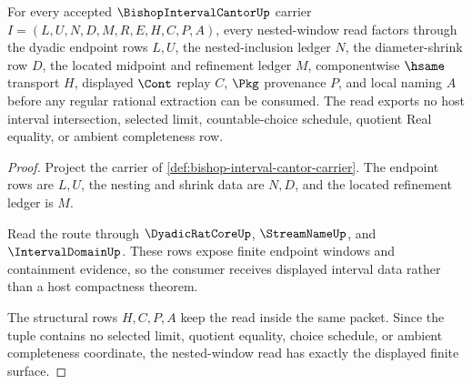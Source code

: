 \begin{theorem}
\label{thm:bishop-interval-cantor-nested-window}
For every accepted $\BishopIntervalCantorUp$ carrier $I=(L,U,N,D,M,R,E,H,C,P,A)$, every nested-window read factors through the dyadic endpoint rows $L,U$, the nested-inclusion ledger $N$, the diameter-shrink row $D$, the located midpoint and refinement ledger $M$, componentwise $\hsame$ transport $H$, displayed $\Cont$ replay $C$, $\Pkg$ provenance $P$, and local naming $A$ before any regular rational extraction can be consumed. The read exports no host interval intersection, selected limit, countable-choice schedule, quotient Real equality, or ambient completeness row.
\end{theorem}
\begin{proof}
Project the carrier of \autoref{def:bishop-interval-cantor-carrier}. The endpoint rows are $L,U$, the nesting and shrink data are $N,D$, and the located refinement ledger is $M$.

Read the route through $\DyadicRatCoreUp$, $\StreamNameUp$, and $\IntervalDomainUp$. These rows expose finite endpoint windows and containment evidence, so the consumer receives displayed interval data rather than a host compactness theorem.

The structural rows $H,C,P,A$ keep the read inside the same packet. Since the tuple contains no selected limit, quotient equality, choice schedule, or ambient completeness coordinate, the nested-window read has exactly the displayed finite surface.
\end{proof}

